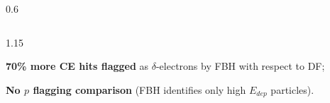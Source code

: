 \documentclass{beamer}
\begin{document}
\begin{frame}
\begin{columns}
\begin{column}{0.6\framewidth}
        \end{column}
    \end{columns}
    \vspace{-4.mm}
          \begin{columns}
      \begin{column}{1.15\framewidth}
    \setlength{\leftmargini}{0.9em}
    \begin{itemize}
      {\small  \item \textbf{70\% more CE hits flagged} as $\delta$-electrons by FBH with respect to DF; 
      \vspace{-0.5mm}
      \item \textbf{No $p$ flagging comparison} (FBH identifies only high $E_{dep}$ particles).
}
      \end{itemize}
      \end{column}
      \end{columns}
          \vspace{-3.7mm}
\begin{columns}
 

\end{columns}
\end{frame}
\end{document}
